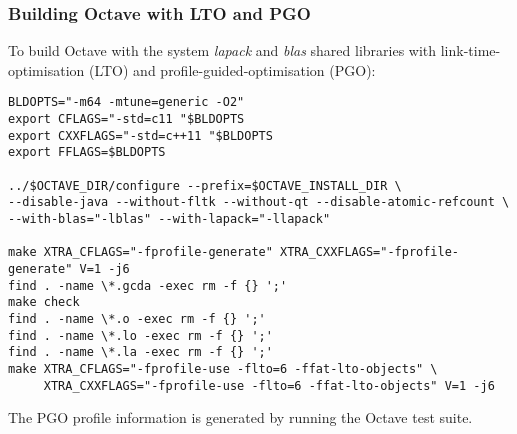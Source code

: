 \documentclass[a4paper,twoside,10pt,english]{report}
\begin{document}
\subsubsection*{Building Octave with LTO and PGO}
To build Octave with the system \emph{lapack} and \emph{blas} shared libraries
with link-time-optimisation (LTO) and profile-guided-optimisation (PGO):
\begin{small}
\begin{verbatim}
BLDOPTS="-m64 -mtune=generic -O2"
export CFLAGS="-std=c11 "$BLDOPTS
export CXXFLAGS="-std=c++11 "$BLDOPTS
export FFLAGS=$BLDOPTS

../$OCTAVE_DIR/configure --prefix=$OCTAVE_INSTALL_DIR \
--disable-java --without-fltk --without-qt --disable-atomic-refcount \
--with-blas="-lblas" --with-lapack="-llapack"

make XTRA_CFLAGS="-fprofile-generate" XTRA_CXXFLAGS="-fprofile-generate" V=1 -j6 
find . -name \*.gcda -exec rm -f {} ';'
make check
find . -name \*.o -exec rm -f {} ';'
find . -name \*.lo -exec rm -f {} ';'
find . -name \*.la -exec rm -f {} ';'
make XTRA_CFLAGS="-fprofile-use -flto=6 -ffat-lto-objects" \
     XTRA_CXXFLAGS="-fprofile-use -flto=6 -ffat-lto-objects" V=1 -j6 
\end{verbatim}
\end{small}
The PGO profile information is generated by running the Octave test suite.
\end{document}
